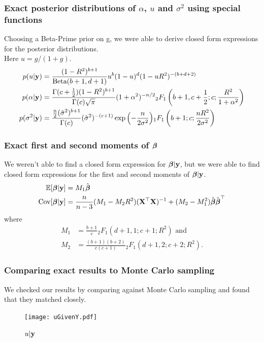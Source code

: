 \documentclass{beamer}
\begin{document}
\begin{frame}
	\frametitle{Exact posterior distributions of $\alpha$, $u$ and $\sigma^2$ using special functions}

	Choosing a Beta-Prime prior on g, we were able to derive closed form expressions for the posterior
	distributions. \\
	Here $u = g/(1 + g)$.
	\small
	\begin{align*}
		p(u | {\bf y}) &= \frac{(1 - R^2)^{b + 1}}{\text{Beta}(b + 1, d + 1)} u^b (1 - u)^d (1 - u R^2)^{-(b + d + 2)} \\
		p(\alpha | {\bf y}) &= \frac{\Gamma(c + \frac{1}{2}) (1 - R^2)^{b + 1}}{\Gamma(c) \sqrt{\pi}} (1 + \alpha^2)^{-n/2}
		{}_2 F_1 \left(b + 1, c + \frac{1}{2}; c; \frac{R^2}{1 + \alpha^2}\right) \\
		p(\sigma^2 | {\bf y}) &= \frac{\frac{n}{2} (\hat{\sigma}^2)^{b + 1}}{\Gamma(c)} (\hat{\sigma}^2)^{-(c + 1)}
												\exp{\left( -\frac{n}{2 \sigma^2} \right)} {}_1 F_1 \left(b + 1; c; \frac{n R^2}{2 \sigma^2}\right) \\
	\end{align*}
\end{frame}

\begin{frame}
	\frametitle{Exact first and second moments of ${\boldsymbol \beta}$}
	We weren't able to find a closed form expression for ${\boldsymbol \beta} | {\bf y}$, but we were able to find closed form
	expressions for the first and second moments of ${\boldsymbol \beta} | {\bf y}$.
	\small
	\begin{align*}
		\mathbb{E}[{\boldsymbol \beta} | {\bf y}] &= M_1 \hat{{\boldsymbol \beta}} \\
		\mbox{Cov}[{\boldsymbol \beta} | {\bf y}] &= \frac{n}{n - 3} (M_1 - M_2 R^2)({\bf X}^\top {\bf X})^{-1} + (M_2 - M_1^2) \hat{{\boldsymbol \beta}} \hat{{\boldsymbol \beta}}^\top
	\end{align*}
	where
	\small
	\begin{align*}
		M_1 &= \frac{b + 1}{c} {}_2 F_1 (d + 1, 1; c + 1; R^2) \text{ and } \\
		M_2 &= \frac{(b + 1)(b + 2)}{c(c + 1)} {}_2 F_1 (d + 1, 2; c + 2; R^2).
	\end{align*}
\end{frame}


\begin{frame}
	\frametitle{Comparing exact results to Monte Carlo sampling}
	We checked our results by comparing against Monte Carlo sampling and found that they matched closely.
	\begin{figure}
		\caption{$u | {\bf y}$}
		\texttt{[image: uGivenY.pdf]}
	\end{figure}
\end{frame}
\end{document}
